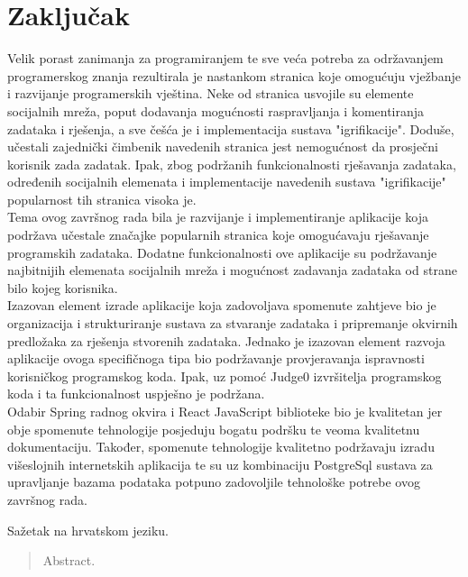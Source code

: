 \documentclass[times, utf8, zavrsni, numeric]{fer}
\begin{document}
	
	\chapter{Zaključak}
	Velik porast zanimanja za programiranjem te sve veća potreba za održavanjem programerskog znanja rezultirala je nastankom stranica koje omogućuju vježbanje i razvijanje programerskih vještina. Neke od stranica usvojile su elemente socijalnih mreža, poput dodavanja mogućnosti raspravljanja i komentiranja zadataka i rješenja, a sve češća je i implementacija sustava "igrifikacije". Doduše, učestali zajednički čimbenik navedenih stranica jest nemogućnost da prosječni korisnik zada zadatak. Ipak, zbog podržanih funkcionalnosti rješavanja zadataka, određenih socijalnih elemenata i implementacije navedenih sustava "igrifikacije" popularnost tih stranica visoka je.\\
	Tema ovog završnog rada bila je razvijanje i implementiranje aplikacije koja podržava učestale značajke popularnih stranica koje omogućavaju rješavanje programskih zadataka. Dodatne funkcionalnosti ove aplikacije su podržavanje najbitnijih elemenata socijalnih mreža i mogućnost zadavanja zadataka od strane bilo kojeg korisnika. \\
	Izazovan element izrade aplikacije koja zadovoljava spomenute zahtjeve bio je organizacija i strukturiranje sustava za stvaranje zadataka i pripremanje okvirnih predložaka za rješenja stvorenih zadataka. Jednako je izazovan element razvoja aplikacije ovoga specifičnoga tipa bio podržavanje provjeravanja ispravnosti korisničkog programskog koda. Ipak, uz pomoć Judge0 izvršitelja programskog koda i ta funkcionalnost uspješno je podržana.\\
	Odabir Spring radnog okvira i React JavaScript biblioteke bio je kvalitetan jer obje spomenute tehnologije posjeduju bogatu podršku te veoma kvalitetnu dokumentaciju. Također, spomenute tehnologije kvalitetno podržavaju izradu višeslojnih internetskih aplikacija te su uz kombinaciju PostgreSql sustava za upravljanje bazama podataka potpuno zadovoljile tehnološke potrebe ovog završnog rada.\\
	
	
	

	
	
	
	\begin{sazetak}
		Sažetak na hrvatskom jeziku.
		
	\end{sazetak}
	
	\begin{abstract}
		Abstract.
		
	\end{abstract}
	
\end{document}
